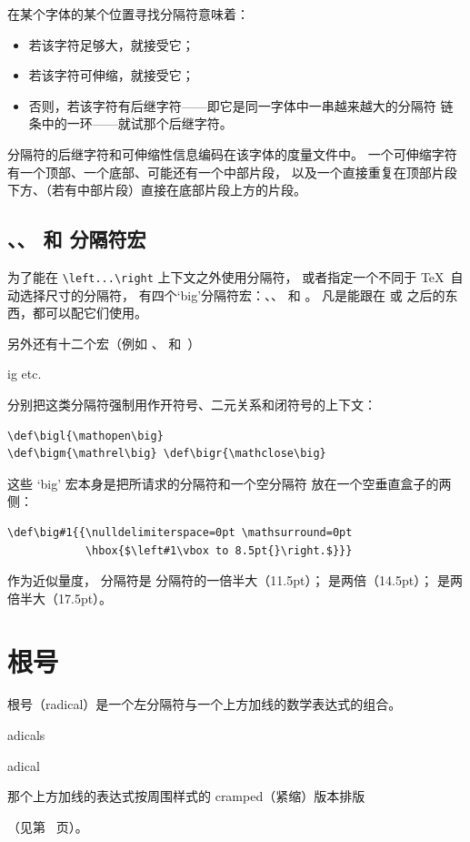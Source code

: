 \documentclass[a4paper]{rapport3}
\makeatletter
\def\alt{}\def\altt{}%
\def\term#1\par{\index{#1}}
\def\cstoidx#1\par{\index{#1@\cs{#1}}}
\def\csterm#1\par{\cstoidx #1\par\cs{#1}}
\makeatother
\begin{document}
在某个字体的某个位置寻找分隔符意味着：
\begin{itemize}\item 若该字符足够大，就接受它；
\item 若该字符可伸缩，就接受它；
\item 否则，若该字符有后继字符——即它是同一字体中一串越来越大的分隔符
  链条中的一环——就试那个后继字符。\end{itemize}
分隔符的后继字符和可伸缩性信息编码在该字体的度量文件中。
一个可伸缩字符有一个顶部、一个底部、可能还有一个中部片段，
以及一个直接重复在顶部片段下方、（若有中部片段）直接在底部片段上方的片段。


\subsection{、、 和  分隔符宏}

为了能在 \verb-\left...\right- 上下文之外使用分隔符，
或者指定一个不同于 \TeX\ 自动选择尺寸的分隔符，
有四个`big'分隔符宏：、、 和 。
凡是能跟在  或  之后的东西，都可以配它们使用。

另外还有十二个宏（例如 、 和~）
\cstoidx big \rm etc.\par
分别把这类分隔符强制用作开符号、二元关系和闭符号的上下文：\begin{verbatim}
\def\bigl{\mathopen\big}
\def\bigm{\mathrel\big} \def\bigr{\mathclose\big}
\end{verbatim}

这些 `big' 宏本身是把所请求的分隔符和一个空分隔符
放在一个空垂直盒子的两侧：
\begin{verbatim}
\def\big#1{{\nulldelimiterspace=0pt \mathsurround=0pt
            \hbox{$\left#1\vbox to 8.5pt{}\right.$}}}
\end{verbatim}
作为近似量度， 分隔符是  分隔符的一倍半大（11.5pt）；
 是两倍（14.5pt）； 是两倍半大（17.5pt）。

\section{根号}

根号（radical）是一个左分隔符与一个上方加线的数学表达式的组合。
\term radicals\par\cstoidx radical\par
那个上方加线的表达式按周围样式的 cramped（紧缩）版本排版
\alt
（见第~\pageref{math:styles} 页）。
\end{document}
